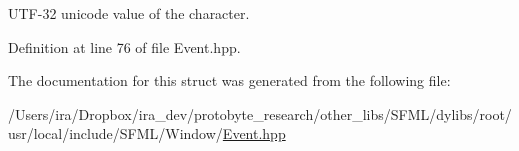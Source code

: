 U\-T\-F-\/32 unicode value of the character. 



Definition at line 76 of file Event.\-hpp.



The documentation for this struct was generated from the following file\-:\begin{DoxyCompactItemize}
\item 
/\-Users/ira/\-Dropbox/ira\-\_\-dev/protobyte\-\_\-research/other\-\_\-libs/\-S\-F\-M\-L/dylibs/root/usr/local/include/\-S\-F\-M\-L/\-Window/\hyperlink{_event_8hpp}{Event.\-hpp}\end{DoxyCompactItemize}
